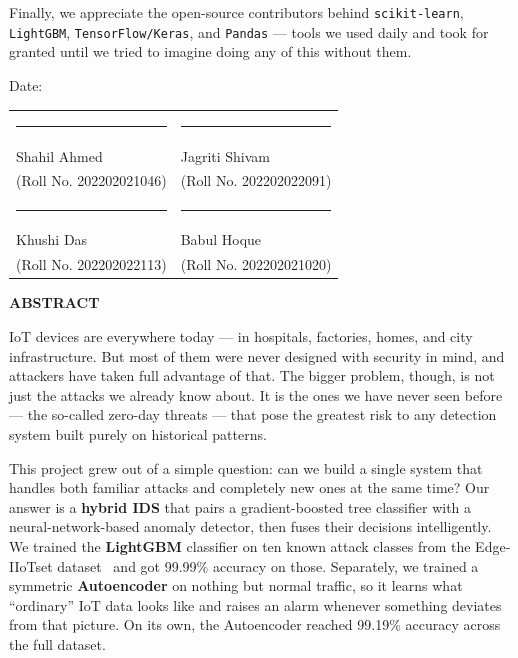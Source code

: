 \documentclass[12pt,a4paper]{report}
\begin{document}
\vspace{0.5cm}
\noindent Finally, we appreciate the open-source contributors behind
\texttt{scikit-learn}, \texttt{LightGBM}, \texttt{TensorFlow/Keras}, and
\texttt{Pandas} — tools we used daily and took for granted until we tried to imagine
doing any of this without them.

\vspace{1.5cm}
\noindent Date: \underline{\hspace{3.5cm}}

\vspace{1.2cm}
\noindent
\begin{tabular}{@{}p{}p{}@{}}
  \rule{6cm}{0.4pt} & \rule{6cm}{0.4pt} \\[2pt]
  Shahil Ahmed & Jagriti Shivam \\
  (Roll No. 202202021046) & (Roll No. 202202022091) \\[1.8cm]
  \rule{6cm}{0.4pt} & \rule{6cm}{0.4pt} \\[2pt]
  Khushi Das & Babul Hoque \\
  (Roll No. 202202022113) & (Roll No. 202202021020) \\
\end{tabular}

\newpage
\begin{center}
{\Large\bfseries ABSTRACT}
\end{center}
\vspace{0.5cm}

IoT devices are everywhere today — in hospitals, factories, homes, and city
infrastructure. But most of them were never designed with security in mind, and
attackers have taken full advantage of that. The bigger problem, though, is not just
the attacks we already know about. It is the ones we have never seen before — the
so-called zero-day threats — that pose the greatest risk to any detection system built
purely on historical patterns.

\vspace{0.5cm}
\noindent This project grew out of a simple question: can we build a single system that
handles both familiar attacks and completely new ones at the same time? Our answer is a
\textbf{hybrid IDS} that pairs a gradient-boosted tree
classifier with a neural-network-based anomaly detector, then fuses their decisions
intelligently. We trained the \textbf{LightGBM} classifier on ten known attack classes
from the Edge-IIoTset dataset~\cite{dataset_edge_iiotset} and got 99.99\% accuracy on
those. Separately, we trained a symmetric \textbf{Autoencoder} on nothing but normal
traffic, so it learns what ``ordinary'' IoT data looks like and raises an alarm whenever
something deviates from that picture. On its own, the Autoencoder reached 99.19\%
accuracy across the full dataset.
\end{document}
